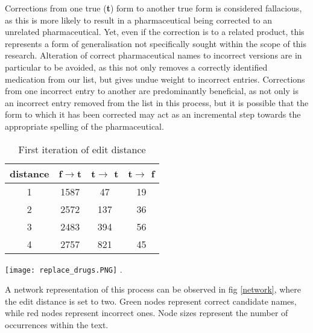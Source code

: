 Corrections from one true (\textbf{t}) form to another true form is considered fallacious, as this is more likely to result in a pharmaceutical being corrected to an unrelated pharmaceutical. Yet, even if the correction is to a related product, this represents a form of generalisation not specifically sought within the scope of this research. Alteration of correct pharmaceutical names to incorrect versions are in particular to be avoided, as this not only removes a correctly identified medication from our list, but gives undue weight to incorrect entries. Corrections from one incorrect entry to another are predominantly beneficial, as not only is an incorrect entry removed from the list in this process, but it is possible that the form to which it has been corrected may act as an incremental step towards the appropriate spelling of the pharmaceutical. 

\begin{table} [ht]
\renewcommand{\arraystretch}{1.3}
\caption{First iteration of edit distance}
\label{table1}
\centering
\begin{tabular}{|c||c||c||c|}
\hline
distance & f$\rightarrow$t & t$\rightarrow$ t & t$\rightarrow$ f\\
\hline
1 & 1587 & 47  & 19   \\
\hline
2 & 2572 & 137 & 36    \\
\hline
3 & 2483 & 394 & 56   \\
\hline
4 & 2757 & 821 & 45  \\
\hline

\end{tabular}
\end{table}

\begin{figure*}[ht]
\centering
\texttt{[image: replace\_drugs.PNG]}
\DeclareGraphicsExtensions.
\caption{Network simulation of correction decisions at a distance of two}
\label{network}
\end{figure*}

A network representation of this process can be observed in fig \ref{network}, where the edit distance is set to two. Green nodes represent correct candidate names, while red nodes represent incorrect ones. Node sizes represent the number of occurrences within the text.

